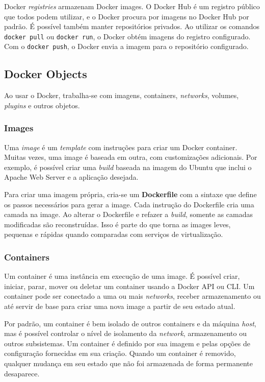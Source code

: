 Docker \textit{registries} armazenam Docker images. O Docker Hub é um registro público que todos podem utilizar, e o Docker procura por imagens no Docker Hub por padrão. É possível também manter repositórios privados. Ao utilizar os comandos \texttt{docker pull} ou \texttt{docker run}, o Docker obtém imagens do registro configurado. Com o \texttt{docker push}, o Docker envia a imagem para o repositório configurado.

\subsection{Docker Objects}

Ao usar o Docker, trabalha-se com imagens, containers, \textit{networks}, volumes, \textit{plugins} e outros objetos.

\subsubsection{Images}

Uma \textit{image} é um \textit{template} com instruções para criar um Docker container. Muitas vezes, uma image é baseada em outra, com customizações adicionais. Por exemplo, é possível criar uma \textit{build} baseada na imagem do Ubuntu que inclui o Apache Web Server e a aplicação desejada.

Para criar uma imagem própria, cria-se um \textbf{Dockerfile} com a sintaxe que define os passos necessários para gerar a image. Cada instrução do Dockerfile cria uma camada na image. Ao alterar o Dockerfile e refazer a \textit{build}, somente as camadas modificadas são reconstruídas. Isso é parte do que torna as images leves, pequenas e rápidas quando comparadas com serviços de virtualização.

\subsubsection{Containers}

Um container é uma instância em execução de uma image. É possível criar, iniciar, parar, mover ou deletar um container usando a Docker API ou CLI. Um container pode ser conectado a uma ou mais \textit{networks}, receber armazenamento ou até servir de base para criar uma nova image a partir de seu estado atual.

Por padrão, um container é bem isolado de outros containers e da máquina \textit{host}, mas é possível controlar o nível de isolamento da \textit{network}, armazenamento ou outros subsistemas. Um container é definido por sua imagem e pelas opções de configuração fornecidas em sua criação. Quando um container é removido, qualquer mudança em seu estado que não foi armazenada de forma permanente desaparece.

